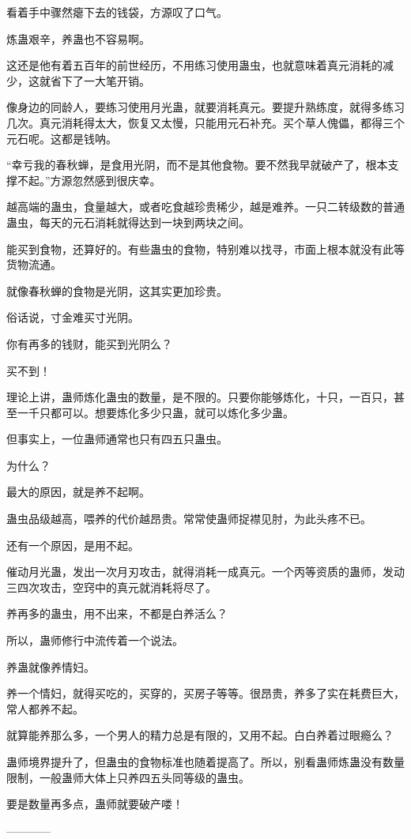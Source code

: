 \begin{this_body}
看着手中骤然瘪下去的钱袋，方源叹了口气。

炼蛊艰辛，养蛊也不容易啊。

这还是他有着五百年的前世经历，不用练习使用蛊虫，也就意味着真元消耗的减少，这就省下了一大笔开销。

像身边的同龄人，要练习使用月光蛊，就要消耗真元。要提升熟练度，就得多练习几次。真元消耗得太大，恢复又太慢，只能用元石补充。买个草人傀儡，都得三个元石呢。这都是钱呐。

“幸亏我的春秋蝉，是食用光阴，而不是其他食物。要不然我早就破产了，根本支撑不起。”方源忽然感到很庆幸。

越高端的蛊虫，食量越大，或者吃食越珍贵稀少，越是难养。一只二转级数的普通蛊虫，每天的元石消耗就得达到一块到两块之间。

能买到食物，还算好的。有些蛊虫的食物，特别难以找寻，市面上根本就没有此等货物流通。

就像春秋蝉的食物是光阴，这其实更加珍贵。

俗话说，寸金难买寸光阴。

你有再多的钱财，能买到光阴么？

买不到！

理论上讲，蛊师炼化蛊虫的数量，是不限的。只要你能够炼化，十只，一百只，甚至一千只都可以。想要炼化多少只蛊，就可以炼化多少蛊。

但事实上，一位蛊师通常也只有四五只蛊虫。

为什么？

最大的原因，就是养不起啊。

蛊虫品级越高，喂养的代价越昂贵。常常使蛊师捉襟见肘，为此头疼不已。

还有一个原因，是用不起。

催动月光蛊，发出一次月刃攻击，就得消耗一成真元。一个丙等资质的蛊师，发动三四次攻击，空窍中的真元就消耗将尽了。

养再多的蛊虫，用不出来，不都是白养活么？

所以，蛊师修行中流传着一个说法。

养蛊就像养情妇。

养一个情妇，就得买吃的，买穿的，买房子等等。很昂贵，养多了实在耗费巨大，常人都养不起。

就算能养那么多，一个男人的精力总是有限的，又用不起。白白养着过眼瘾么？

蛊师境界提升了，但蛊虫的食物标准也随着提高了。所以，别看蛊师炼蛊没有数量限制，一般蛊师大体上只养四五头同等级的蛊虫。

要是数量再多点，蛊师就要破产喽！

------------

\end{this_body}

